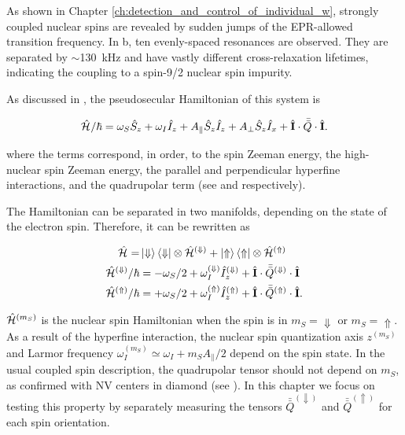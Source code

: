 As shown in Chapter \ref{ch:detection_and_control_of_individual_w}, strongly coupled nuclear spins are revealed by sudden jumps of the \Er EPR-allowed transition frequency. In b, ten evenly-spaced resonances are observed. They are separated by $\sim$130~kHz and have vastly different cross-relaxation lifetimes, indicating the coupling to a spin-9/2 nuclear spin impurity.  

As discussed in , the pseudosecular Hamiltonian of this system is

\begin{equation}
    \hat{\mathcal{H}}_{\text{}}/\hbar = \omega_S \hat{S}_z + \omega_I \hat{I}_z + A_\parallel \hat{S}_z \hat{I}_z + A_\perp \hat{S}_z \hat{I}_x + \hat{\mathbf{I}} \cdot \bar{\bar{Q}} \cdot \hat{\mathbf{I}}.
    \label{eq:hamiltonian_ninehalf_full}
\end{equation}

where the terms correspond, in order, to the \Er spin Zeeman energy, the high-nuclear spin Zeeman energy, the parallel and perpendicular hyperfine interactions, and the quadrupolar term (see  and  respectively). 

The Hamiltonian can be separated in two manifolds, depending on the state of the electron spin. Therefore, it can be rewritten as

\begin{align}
\begin{split}
    \hat{\mathcal{H}}_{\text{}} = &\ket{\Downarrow}\bra{\Downarrow}\otimes \hat{\mathcal{H}}_{\text{}}^{(\Downarrow)} + \ket{\Uparrow}\bra{\Uparrow}\otimes \hat{\mathcal{H}}_{\text{}}^{(\Uparrow)} \\
    \hat{\mathcal{H}}_{\text{}}^{(\Downarrow)}/\hbar &= -\omega_S / 2 + \omega_I^{(\Downarrow)} \hat{I}_z^{(\Downarrow)} + \hat{\mathbf{I}}\cdot \bar{\bar{Q}}^{(\Downarrow)}\cdot \hat{\mathbf{I}} \\ 
    \hat{\mathcal{H}}_{\text{}}^{(\Uparrow)}/\hbar &= +\omega_S / 2 + \omega_I^{(\Uparrow)}\hat{I}_z^{(\Uparrow)} + \hat{\mathbf{I}}\cdot \bar{\bar{Q}}^{(\Uparrow)} \cdot\hat{\mathbf{I}}.
\end{split}
\label{eq:up_down_hamiltonian}
\end{align}


\noindent  $\hat{\mathcal{H}}_{\text{}}^{(m_S)}$ is the nuclear spin Hamiltonian when the \Er spin is in $m_S = \Downarrow$ or $m_S = \Uparrow$. As a result of the hyperfine interaction, the nuclear spin quantization axis $z^{(m_S)}$ and Larmor frequency $\omega_I^{(m_S)} \simeq \omega_I + m_S A_\parallel/2 $ depend on the \Er spin state. In the usual coupled spin description, the quadrupolar tensor should not depend on $m_S$, as confirmed with NV centers in diamond (see ). In this chapter we focus on testing this property by separately measuring the tensors $\bar{\bar{Q}}^{(\Downarrow)}$ and $\bar{\bar{Q}}^{(\Uparrow)}$ for each \Er spin orientation. 

